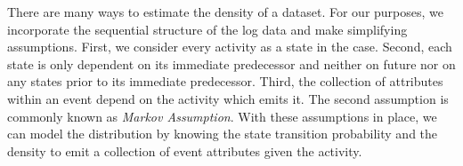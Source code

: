 \documentclass[./../../paper.tex]{subfiles}
\begin{document}


There are many ways to estimate the density of a dataset. For our purposes, we incorporate the sequential structure of the log data and make simplifying assumptions. First, we consider every activity as a state in the case. Second, each state is only dependent on its immediate predecessor and neither on future nor on any states prior to its immediate predecessor. Third, the collection of attributes within an event depend on the activity which emits it. The second assumption is commonly known as \emph{Markov Assumption}. With these assumptions in place, we can model the distribution by knowing the state transition probability and the density to emit a collection of event attributes given the activity. 


\end{document}
